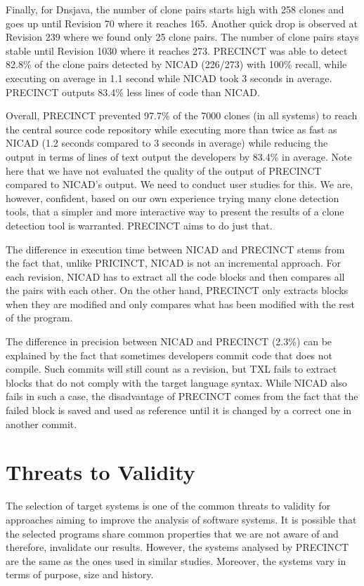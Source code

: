 \documentclass[conference]{IEEEtran}
\begin{document}
Finally, for Dnsjava, the number of clone pairs starts high with 258 clones and goes up until Revision 70 where it reaches 165. Another quick drop is observed at Revision 239 where we found only 25 clone pairs. The number of clone pairs stays stable until Revision 1030 where it reaches 273. PRECINCT was able to detect 82.8\% of the clone pairs detected by NICAD (226/273) with 100\% recall, while executing on average in 1.1 second while NICAD took 3 seconds in average. PRECINCT outputs  83.4\% less lines of code than NICAD.

Overall, PRECINCT prevented 97.7\% of the 7000 clones (in all systems) to reach the central source code repository while executing more than twice as fast as NICAD (1.2 seconds compared to 3 seconds in average) while reducing the output in terms of lines of text output the developers by 83.4\% in average. Note here that we have not evaluated the quality of the output of PRECINCT compared to NICAD's output. We need to conduct user studies for this. We are, however, confident, based on our own experience trying many clone detection tools, that a simpler and more interactive way to present the results of a clone detection tool is warranted. PRECINCT aims to do just that.

The difference in execution time between NICAD and PRECINCT stems from the fact that, unlike PRICINCT, NICAD is not an incremental approach. For each revision, NICAD has to extract all the code blocks and then compares all the pairs with each other. On the other hand, PRECINCT only extracts blocks when they are modified and only compares what has been modified with the rest of the program.

The difference in precision between NICAD and PRECINCT (2.3\%)  can be explained by the fact that sometimes developers commit code that does not compile.
Such commits will still count as a revision, but TXL fails to extract blocks that do not comply with the target language syntax.
While NICAD also fails in such a case, the disadvantage of PRECINCT comes from the fact that the failed block is saved and used as reference until it is changed by a correct one in another commit.

\section{Threats to Validity}
\label{sec:Threats to Validity}

The selection of target systems is one of the common threats to validity for approaches aiming to improve the analysis of software systems.
It is possible that the selected programs share common properties that we are not aware of and therefore, invalidate our results.
However, the systems analysed by PRECINCT are the same as the ones used in similar studies.
Moreover, the systems  vary in terms of purpose, size and history.
\end{document}

